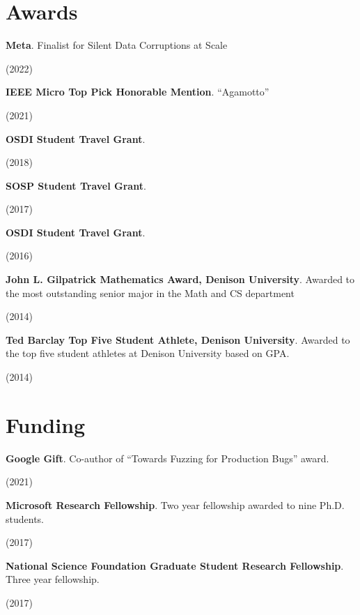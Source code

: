\documentclass[letterpaper,10pt]{article}
\newcommand{\sidebyside}[2]{
  \begin{minipage}[t]{.75\textwidth}
    \raggedright{}
    #2
  \end{minipage}
  \hspace{.01\textwidth}
    \begin{minipage}[t]{.205\textwidth}
    \raggedleft
    #1
  \end{minipage}
}
\newcommand{\trio}[3]{\sidebyside{#3}{\textbf{#1}. #2}}
\begin{document}
\section{Awards}
\begin{smenumerate}
\item \trio{Meta}{Finalist for Silent Data Corruptions at Scale}{(2022)}
\item \trio{IEEE Micro Top Pick Honorable Mention}{``Agamotto''}{(2021)}
\item \trio{OSDI Student Travel Grant}{}{(2018)}
\item \trio{SOSP Student Travel Grant}{}{(2017)}
\item \trio{OSDI Student Travel Grant}{}{(2016)}
\item \trio{John L. Gilpatrick Mathematics Award, Denison University}{Awarded to
  the most outstanding senior major in the Math and CS department}{(2014)}
\item \trio{Ted Barclay Top Five Student Athlete, Denison University}{Awarded to
  the top five student athletes at Denison University based on GPA.}{(2014)}
\end{smenumerate}

\section{Funding}
\begin{smenumerate}
\item \trio{Google Gift}{Co-author of ``Towards Fuzzing for Production Bugs'' award.}{(2021)}
\item \trio{Microsoft Research Fellowship}{Two year fellowship awarded to
  nine Ph.D. students.}{(2017)}
\item \trio{National Science Foundation Graduate Student Research
  Fellowship}{Three year fellowship.}{(2017)}
\end{smenumerate}
\end{document}
